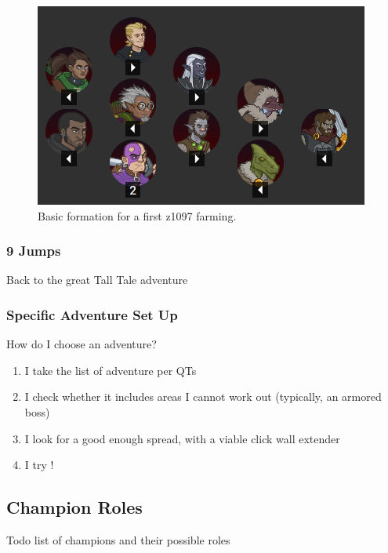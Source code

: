\documentclass{article}
\begin{document}
\begin{figure}[ht!]
    \centering
    \includegraphics[width=\linewidth]{sevenJumpsFormation1}
    \caption{Basic formation for a first z1097 farming.}%
    \label{fig:sevenJumpsFormation1}
\end{figure}

\subsubsection{9 Jumps}

Back to the great Tall Tale adventure

\subsubsection{Specific Adventure Set Up}

How do I choose an adventure?
\begin{enumerate}
    \item I take the list of adventure per QTs
    \item I check whether it includes areas I cannot work out (typically, an armored boss)
    \item I look for a good enough spread, with a viable click wall extender
    \item I try !
\end{enumerate}


\subsection{Champion Roles}

Todo list of champions and their possible roles

\end{document}
